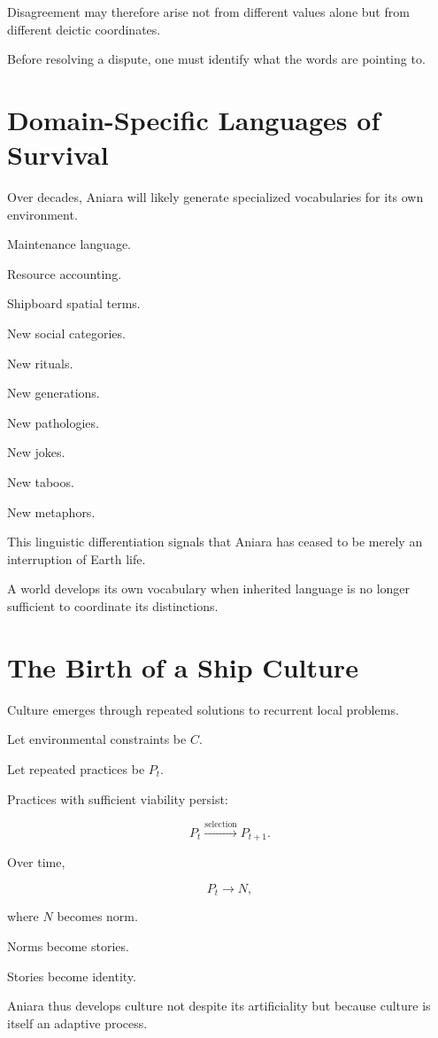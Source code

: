 \documentclass[11pt,oneside]{book}
\theoremstyle{definition}
\theoremstyle{remark}
\begin{document}
Disagreement may therefore arise not from different values alone but from different deictic coordinates.

Before resolving a dispute, one must identify what the words are pointing to.

\section{Domain-Specific Languages of Survival}

Over decades, Aniara will likely generate specialized vocabularies for its own environment.

Maintenance language.

Resource accounting.

Shipboard spatial terms.

New social categories.

New rituals.

New generations.

New pathologies.

New jokes.

New taboos.

New metaphors.

This linguistic differentiation signals that Aniara has ceased to be merely an interruption of Earth life.

A world develops its own vocabulary when inherited language is no longer sufficient to coordinate its distinctions.

\section{The Birth of a Ship Culture}

Culture emerges through repeated solutions to recurrent local problems.

Let environmental constraints be \(C\).

Let repeated practices be \(P_t\).

Practices with sufficient viability persist:

\[
P_t
\xrightarrow{\text{selection}}
P_{t+1}.
\]

Over time,

\[
P_t\rightarrow N,
\]

where \(N\) becomes norm.

Norms become stories.

Stories become identity.

Aniara thus develops culture not despite its artificiality but because culture is itself an adaptive process.
\end{document}

